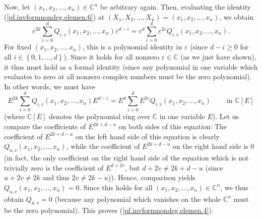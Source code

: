 \documentclass
[numbers=enddot,12pt,final,onecolumn,german,notitlepage]{scrartcl}%
\theoremstyle{definition}
\begin{document}
Now, let $\left(  x_{1},x_{2},...,x_{n}\right)  \in\mathbb{C}^{n}$ be
arbitrary again. Then, evaluating the identity
(\ref{pf.invformnondeg.elemen.6}) at $\left(  X_{1},X_{2},...,X_{n}\right)
=\left(  x_{1},x_{2},...,x_{n}\right)  $, we obtain
\[
\varepsilon^{2k}\sum\limits_{i=0}^{d}Q_{i,v}\left(  x_{1},x_{2},...,x_{n}%
\right)  \varepsilon^{d-i}=\varepsilon^{d}\sum\limits_{i=0}^{d}\varepsilon
^{2v}Q_{i,v}\left(  x_{1},x_{2},...,x_{n}\right)  .
\]
For fixed $\left(  x_{1},x_{2},...,x_{n}\right)  $, this is a polynomial
identity in $\varepsilon$ (since $d-i\geq0$ for all $i\in\left\{
0,1,...,d\right\}  $). Since it holds for all nonzero $\varepsilon
\in\mathbb{C}$ (as we just have shown), it thus must hold as a formal identity
(since any polynomial in one variable which evaluates to zero at all nonzero
complex numbers must be the zero polynomial). In other words, we must have%
\[
E^{2k}\sum\limits_{i=0}^{d}Q_{i,v}\left(  x_{1},x_{2},...,x_{n}\right)
E^{d-i}=E^{d}\sum\limits_{i=0}^{d}E^{2v}Q_{i,v}\left(  x_{1},x_{2}%
,...,x_{n}\right)  \ \ \ \ \ \ \ \ \ \ \text{in }\mathbb{C}\left[  E\right]
\]
(where $\mathbb{C}\left[  E\right]  $ denotes the polynomial ring over
$\mathbb{C}$ in one variable $E$). Let us compare the coefficients of
$E^{2k+d-u}$ on both sides of this equation: The coefficient of $E^{2k+d-u}$
on the left hand side of this equation is clearly $Q_{u,v}\left(  x_{1}%
,x_{2},...,x_{n}\right)  $, while the coefficient of $E^{2k+d-u}$ on the right
hand side is $0$ (in fact, the only coefficient on the right hand side of the
equation which is not trivially zero is the coefficient of $E^{d+2v}$, but
$d+2v\neq2k+d-u$ (since $u+2v\neq2k$ and thus $2v\neq2k-u$)). Hence,
comparison yields $Q_{u,v}\left(  x_{1},x_{2},...,x_{n}\right)  =0$. Since
this holds for all $\left(  x_{1},x_{2},...,x_{n}\right)  \in\mathbb{C}^{n}$,
we thus obtain $Q_{u,v}=0$ (because any polynomial which vanishes on the whole
$\mathbb{C}^{n}$ must be the zero polynomial). This proves
(\ref{pf.invformnondeg.elemen.4}).
\end{document}
